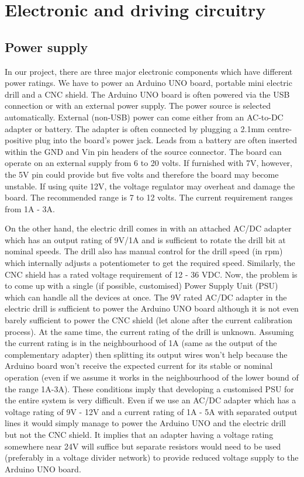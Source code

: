 \chapter{Electronic and driving circuitry} \label{chapter4}

\section{Power supply} \label{psupply}

In our project, there are three major electronic components which have different power ratings. We have to power an Arduino UNO board, portable mini electric drill and a CNC shield. The Arduino UNO board  \cite{arduino_ref} is often powered via the USB connection or with an external power supply. The power source is selected automatically. External (non-USB) power can come either from an AC-to-DC adapter or battery. The adapter is often connected by plugging a 2.1mm centre-positive plug into the board's power jack. Leads from a battery are often inserted within the GND and Vin pin headers of the source connector. The board can operate on an external supply from 6 to 20 volts. If furnished with 7V, however, the 5V pin could provide but five volts and therefore the board may become unstable. If using quite 12V, the voltage regulator may overheat and damage the board. The recommended range is 7 to 12 volts. The current requirement ranges from 1A - 3A. \par

On the other hand, the electric drill comes in with an attached AC/DC adapter which has an output rating of 9V/1A and is sufficient to rotate the drill bit at nominal speeds. The drill also has manual control for the drill speed (in rpm) which internally adjusts a potentiometer to get the required speed. Similarly, the CNC shield has a rated voltage requirement of 12 - 36 VDC. Now, the problem is to come up with a single (if possible, customised) Power Supply Unit (PSU) which can handle all the devices at once. The 9V rated AC/DC adapter in the electric drill is sufficient to power the Arduino UNO board although it is not even barely sufficient to power the CNC shield (let alone after the current calibration process). At the same time, the current rating of the drill is unknown. Assuming the current rating is in the neighbourhood of 1A (same as the output of the complementary adapter) then splitting its output wires won’t help because the Arduino board won’t receive the expected current for its stable or nominal operation (even if we assume it works in the neighbourhood of the lower bound of the range 1A-3A). These conditions imply that developing a customised PSU for the entire system is very difficult. Even if we use an AC/DC adapter which has a voltage rating of 9V - 12V and a current rating of 1A - 5A with separated output lines it would simply manage to power the Arduino UNO and the electric drill but not the CNC shield. It implies that an adapter having a voltage rating somewhere near 24V will suffice but separate resistors would need to be used (preferably in a voltage divider network) to provide reduced voltage supply to the Arduino UNO board. \par


